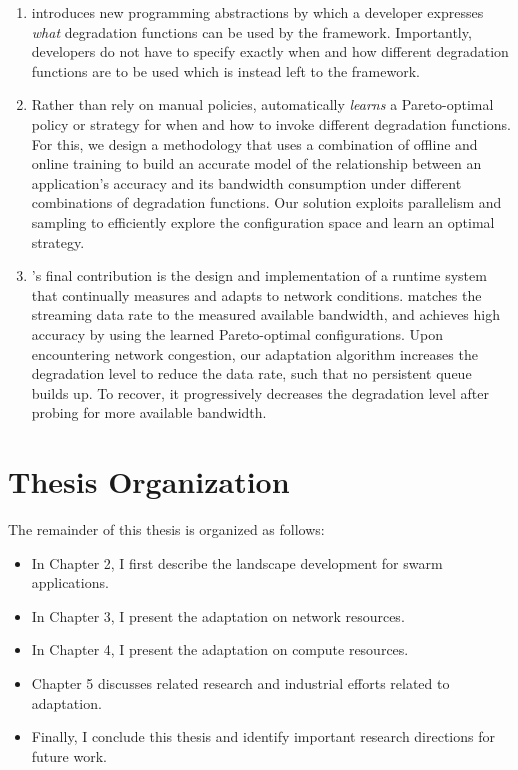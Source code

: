 \documentclass[thesis.tex]{subfiles}
\begin{document}
\begin{enumerate}
\item \sysname{} introduces new programming abstractions by which a developer
  expresses \emph{what} degradation functions can be used by the framework.
  Importantly, developers do not have to specify exactly when and how different
  degradation functions are to be used which is instead left to the \sysname{}
  framework.

\item Rather than rely on manual policies, \sysname{} automatically
  \emph{learns} a Pareto-optimal policy or strategy for when and how to invoke
  different degradation functions.  For this, we design a methodology that uses
  a combination of offline and online training to build an accurate model of the
  relationship between an application's accuracy and its bandwidth consumption
  under different combinations of degradation functions. Our solution exploits
  parallelism and sampling to efficiently explore the configuration space and
  learn an optimal strategy.

\item \sysname{}'s final contribution is the design and implementation of a
  runtime system that continually measures and adapts to network conditions.
  \sysname{} matches the streaming data rate to the measured available
  bandwidth, and achieves high accuracy by using the learned Pareto-optimal
  configurations.  Upon encountering network congestion, our adaptation
  algorithm increases the degradation level to reduce the data rate, such that
  no persistent queue builds up. To recover, it progressively decreases the
  degradation level after probing for more available bandwidth.
\end{enumerate}

\section{Thesis Organization}
\label{sec:thesis-organization}

The remainder of this thesis is organized as follows:

\begin{itemize}
\item In Chapter 2, I first describe the landscape development for swarm
  applications.
\item In Chapter 3, I present the adaptation on network resources.
\item In Chapter 4, I present the adaptation on compute resources.
\item Chapter 5 discusses related research and industrial efforts related to
  adaptation.
\item Finally, I conclude this thesis and identify important research directions
  for future work.
\end{itemize}
\end{document}
